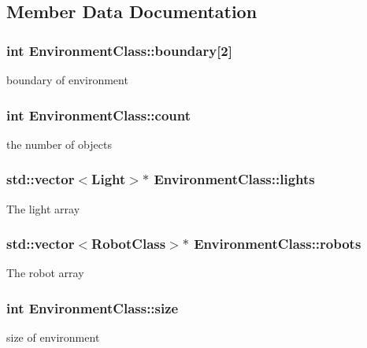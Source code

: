 \subsection{Member Data Documentation}
\hypertarget{classEnvironmentClass_a48581ef606b9f769046d56553766bae6}{
\subsubsection[{boundary}]{\setlength{\rightskip}{0pt plus 5cm}int Environment\-Class\-::boundary\mbox{[}2\mbox{]}\hspace{0.3cm}{\ttfamily [private]}}}\label{classEnvironmentClass_a48581ef606b9f769046d56553766bae6}
boundary of environment \hypertarget{classEnvironmentClass_a9a5b37410d83d107ab1b5d2912fc0a87}{
\subsubsection[{count}]{\setlength{\rightskip}{0pt plus 5cm}int Environment\-Class\-::count\hspace{0.3cm}{\ttfamily [private]}}}\label{classEnvironmentClass_a9a5b37410d83d107ab1b5d2912fc0a87}
the number of objects \hypertarget{classEnvironmentClass_a7c8a628d7a5ebf1db84a266afdd315c3}{
\subsubsection[{lights}]{\setlength{\rightskip}{0pt plus 5cm}std\-::vector$<${\bf Light}$>$$\ast$ Environment\-Class\-::lights\hspace{0.3cm}{\ttfamily [private]}}}\label{classEnvironmentClass_a7c8a628d7a5ebf1db84a266afdd315c3}
The light array \hypertarget{classEnvironmentClass_a4472289c99243f9531cebae28f0aa6e6}{
\subsubsection[{robots}]{\setlength{\rightskip}{0pt plus 5cm}std\-::vector$<${\bf Robot\-Class}$>$$\ast$ Environment\-Class\-::robots\hspace{0.3cm}{\ttfamily [private]}}}\label{classEnvironmentClass_a4472289c99243f9531cebae28f0aa6e6}
The robot array \hypertarget{classEnvironmentClass_a62183824ee7d890044558c6c235bd86e}{
\subsubsection[{size}]{\setlength{\rightskip}{0pt plus 5cm}int Environment\-Class\-::size\hspace{0.3cm}{\ttfamily [private]}}}\label{classEnvironmentClass_a62183824ee7d890044558c6c235bd86e}
size of environment 

